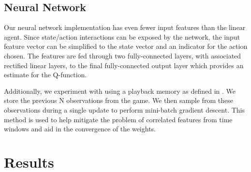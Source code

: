 \documentclass[12pt]{article}
\begin{document}
\subsection{Neural Network}

Our neural network implementation has even fewer input features than the linear agent. Since state/action interactions can be exposed by the network, the input feature vector can be simplified to the state vector and an indicator for the action chosen. The features are fed through two fully-connected layers, with associated rectified linear layers, to the final fully-connected output layer which provides an estimate for the Q-function.

Additionally, we experiment with using a playback memory as defined in \cite{mnih2013playing}. We store the previous N observations from the game. We then sample from these observations during a single update to perform mini-batch gradient descent. This method is used to help mitigate the problem of correlated features from time windows and aid in the convergence of the weights.

\section{Results}
\end{document}
